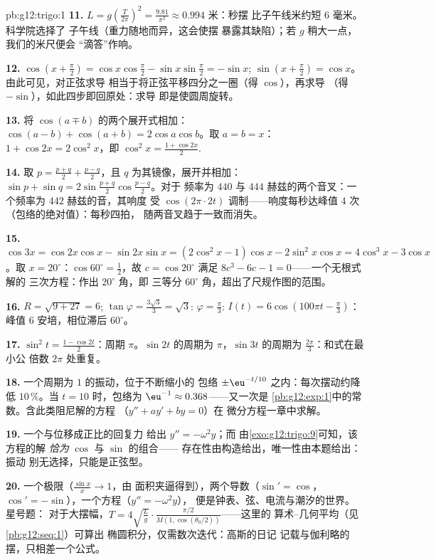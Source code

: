 \begin{solution}{pb:g12:trigo:1}
\textbf{11.} $L = g\left(\frac{T}{2\pi}\right)^2 =
\frac{9.81}{\pi^2} \approx 0.994$ 米：秒摆
比子午线米约短 $6$ 毫米。科学院选择了
子午线（重力随地而异，这会使摆
暴露其缺陷）；若 $g$ 稍大一点，我们的米尺便会
“滴答”作响。

\textbf{12.} $\cos\left(x + \frac\pi2\right) =
\cos x \cos\frac\pi2 - \sin x \sin\frac\pi2 = -\sin x$;
$\sin\left(x + \frac\pi2\right) = \cos x$。由此可见，对正弦求导
相当于将正弦平移四分之一圈（得 $\cos$），再求导
（得 $-\sin$），如此四步即回原处：求导
即是使圆周旋转。

\textbf{13.} 将 $\cos(a \mp b)$ 的两个展开式相加：
$\cos(a-b) + \cos(a+b) = 2\cos a\cos b$。取 $a = b = x$：
$1 + \cos 2x = 2\cos^2 x$，即
$\cos^2 x = \frac{1 + \cos 2x}{2}$.

\textbf{14.} 取 $p = \frac{p+q}{2} + \frac{p-q}{2}$，且
$q$ 为其镜像，展开并相加：
$\sin p + \sin q = 2\sin\frac{p+q}{2}\cos\frac{p-q}{2}$。对于
频率为 $440$ 与 $444$ 赫兹的两个音叉：一个频率为 $442$ 赫兹的音，其响度
受 $\cos(2\pi \cdot 2t)$ 调制——响度每秒达峰值 $4$
次（包络的绝对值）：每秒四拍，
随两音叉趋于一致而消失。

\textbf{15.} $\cos 3x = \cos 2x\cos x - \sin 2x \sin x =
(2\cos^2 x - 1)\cos x - 2\sin^2 x\cos x = 4\cos^3 x -
3\cos x$。取 $x = 20^\circ$：$\cos 60^\circ = \frac12$，故
$c = \cos 20^\circ$ 满足 $8c^3 - 6c - 1 = 0$——一个无根式解的
三次方程：作出 $20^\circ$ 角，即
三等分 $60^\circ$ 角，超出了尺规作图的范围。

\textbf{16.} $R = \sqrt{9 + 27} = 6$;
$\tan\varphi = \frac{3\sqrt3}{3} = \sqrt3$:
$\varphi = \frac\pi3$: $I(t) = 6\cos\left(100\pi t -
\frac\pi3\right)$：峰值 $6$ 安培，相位滞后 $60^\circ$。

\textbf{17.} $\sin^2 t = \frac{1 - \cos 2t}{2}$：周期
$\pi$。$\sin 2t$ 的周期为 $\pi$，$\sin 3t$ 的周期为
$\frac{2\pi}{3}$：和式在最小公
倍数 $2\pi$ 处重复。

\textbf{18.} 一个周期为 $1$ 的振动，位于不断缩小的
包络 $\pm\eu^{-t/10}$ 之内：每次摆动约降低 $10\,\%$。当
$t = 10$ 时，包络为 $\eu^{-1} \approx 0.368$——又一次是
\cref{pb:g12:exp:1}中的常数。含此类阻尼解的方程
（$y'' + a y' + b y = 0$）在
微分方程一章中求解。

\textbf{19.} 一个与位移成正比的回复力
给出 $y'' = -\omega^2 y$；而
由\cref{exo:g12:trigo:9}可知，该方程的解
\emph{恰为} $\cos$ 与 $\sin$ 的组合——
存在性由构造给出，唯一性由本题给出：振动
别无选择，只能是正弦型。

\textbf{20.} 一个极限（$\frac{\sin x}{x} \to 1$，由
面积夹逼得到），两个导数（$\sin' = \cos$，
$\cos' = -\sin$），一个方程（$y'' = -\omega^2 y$），
便是钟表、弦、电流与潮汐的世界。星号题：
对于大摆幅，$T = 4\sqrt{\frac Lg} \cdot
\frac{\pi/2}{M(1, \cos(\theta_0/2))}$——这里的
算术–几何平均（见\cref{pb:g12:seq:1}）可算出
椭圆积分，仅需数次迭代：高斯的日记
记载与伽利略的摆，只相差一个公式。
\end{solution}
